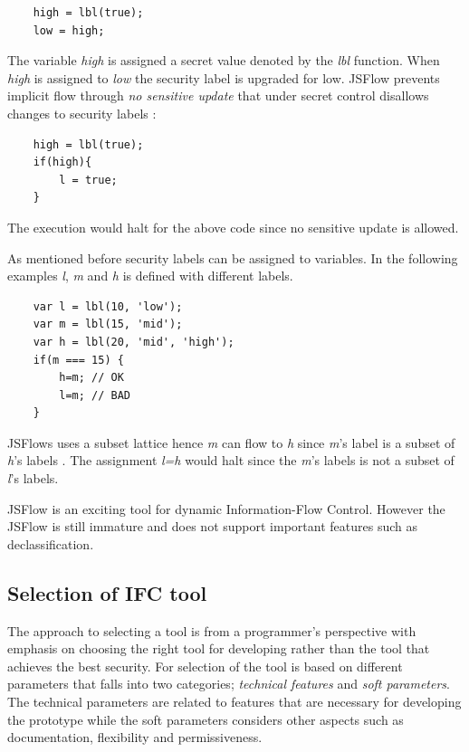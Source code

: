 \begin{lstlisting}
	high = lbl(true);
	low = high;
\end{lstlisting}
 
The variable \emph{high} is assigned a secret value denoted by the \emph{lbl} function. When \emph{high} is assigned to \emph{low} the security label is upgraded for low. JSFlow prevents implicit flow through \emph{no sensitive update} that under secret control disallows changes to security labels \cite{Hedin2014}:

\begin{lstlisting}
	high = lbl(true);
	if(high){
		l = true;
	}
\end{lstlisting}

The execution would halt for the above code since no sensitive update is allowed. 

As mentioned before security labels can be assigned to variables. In the following examples \emph{l}, \emph{m} and \emph{h} is defined with different labels.

\begin{lstlisting}
	var l = lbl(10, 'low');
	var m = lbl(15, 'mid');
	var h = lbl(20, 'mid', 'high');
	if(m === 15) {
		h=m; // OK
		l=m; // BAD
	}
\end{lstlisting}

JSFlows uses a subset lattice hence \emph{m} can flow to \emph{h} since \emph{m}'s label is a subset of \emph{h}'s labels \cite{jsflowsite}. The assignment \emph{l=h} would halt since the \emph{m}'s labels is not a subset of \emph{l}'s labels.


JSFlow is an exciting tool for dynamic Information-Flow Control. However the JSFlow is still immature and does not support important features such as declassification.

\subsection{Selection of IFC tool}
The approach to selecting a tool is from a programmer's perspective with emphasis on choosing the right tool for developing rather than the tool that achieves the best security.
For selection of the tool is based on different parameters that falls into two categories; \emph{technical features} and \emph{soft parameters}. The technical parameters are related to features that are necessary for developing the prototype while the soft parameters considers other aspects such as documentation, flexibility and permissiveness.

